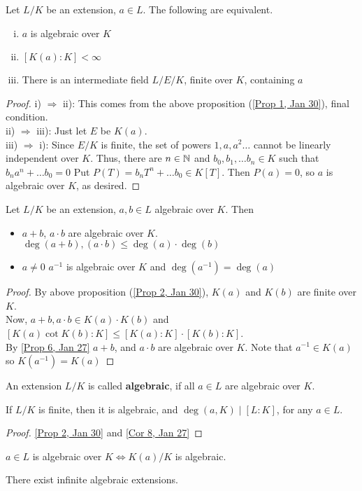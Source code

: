 \begin{prop}\label{Prop 2, Jan 30}
    Let $L / K$ be an extension, $a \in L$. The following are equivalent.
    \begin{enumerate}[i)]
        \item $a$ is algebraic over $K$
        \item $[K(a) : K] < \infty$
        \item There is an intermediate field $L/E/K$, finite over $K$, containing $a$
    \end{enumerate}
\end{prop}
\begin{proof}
    i) $\Rightarrow$ ii): This comes from the above proposition (\ref{Prop 1, Jan 30}), final condition. \\
    ii) $\Rightarrow$ iii): Just let $E$ be $K(a)$. \\
    iii) $\Rightarrow$ i): Since $E / K$ is finite, the set of powers $1,a,a^2 \dots$ cannot
    be linearly independent over $K$. Thus, there are $n \in \mathbb{N}$ and $b_0, b_{1}, \dots b_{n} \in K$
    such that $b_na^n + \dots b_0 = 0$ Put $P(T) = b_nT^n + \dots b_0 \in K[T]$. Then $P(a) = 0$,
    so $a$ is algebraic over $K$, as desired.
\end{proof}

\begin{cor} \label{Cor 3, Jan 30}
    Let $L / K$ be an extension, $a,b \in L$ algebraic over $K$. Then
    \begin{itemize}
        \item $a + b$, $a \cdot b$ are algebraic over $K$. $\deg(a + b), (a \cdot b) \leq \deg(a)
        \cdot \deg(b)$
        \item $a \neq 0$ $a^{-1}$ is algebraic over $K$ and $\deg(a^{-1}) = \deg(a)$
    \end{itemize}
\end{cor}

\begin{proof}
    By above proposition (\ref{Prop 2, Jan 30}), $K(a)$ and $K(b)$ are finite over $K$. \\
    Now, $a + b, a \cdot b \in K(a)\cdot K(b)$ and $[K(a) \cot K(b) : K] \leq [K(a) : K]
    \cdot [K(b): K]$. \\
    By \ref{Prop 6, Jan 27} $a + b$, and $a \cdot b$ are algebraic over $K$. Note that $a^{-1} \in K(a)$
    so $K(a^{-1}) = K(a)$
\end{proof}
\begin{defn} \label{Defn 5, Jan 30}
    An extension $L / K$ is called \textbf{algebraic}, if all $a \in L$ are algebraic
    over $K$.
\end{defn}
\begin{cor} \label{Cor 6, Jan 30}
    If $L / K$ is finite, then it is algebraic, and $\deg(a,K) \mid [L:K]$, for
    any $a \in L$.
\end{cor}
\begin{proof}
    \ref{Prop 2, Jan 30} and \ref{Cor 8, Jan 27}
\end{proof}

\begin{rmk}
    $a \in L$ is algebraic over $K \iff K(a) / K$ is algebraic.
\end{rmk}
\begin{rmk}
    There exist infinite algebraic extensions.
\end{rmk}
